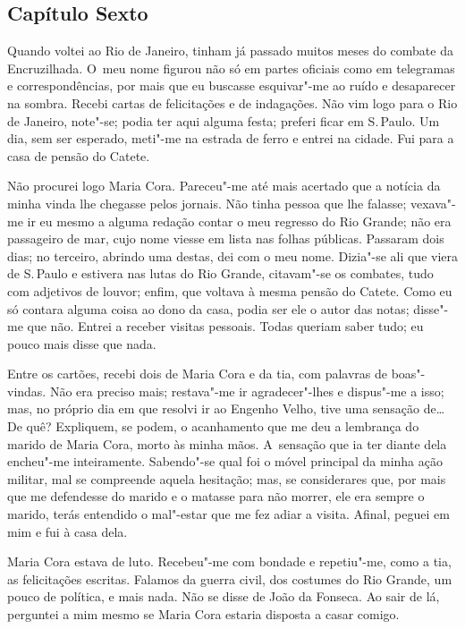 \begin{linenumbers}
\section{Capítulo Sexto}

Quando voltei ao Rio de Janeiro, tinham já passado muitos meses do
combate da Encruzilhada. O~meu nome figurou não só em partes oficiais
como em telegramas e correspondências, por mais que eu buscasse
esquivar"-me ao ruído e desaparecer na sombra. Recebi cartas de
felicitações e de indagações. Não vim logo para o Rio de Janeiro,
note"-se; podia ter aqui alguma festa; preferi ficar em S.\,Paulo. Um dia,
sem ser esperado, meti"-me na estrada de ferro e entrei na cidade. Fui
para a casa de pensão do Catete.

Não procurei logo Maria Cora. Pareceu"-me até mais acertado que a notícia
da minha vinda lhe chegasse pelos jornais. Não tinha pessoa que lhe
falasse; vexava"-me ir eu mesmo a alguma redação contar o meu regresso do
Rio Grande; não era passageiro de mar, cujo nome viesse em lista nas
folhas públicas. Passaram dois dias; no terceiro, abrindo uma destas,
dei com o meu nome. Dizia"-se ali que viera de S.\,Paulo e estivera nas
lutas do Rio Grande, citavam"-se os combates, tudo com adjetivos de
louvor; enfim, que voltava à mesma pensão do Catete. Como eu só contara
alguma coisa ao dono da casa, podia ser ele o autor das notas; disse"-me
que não. Entrei a receber visitas pessoais. Todas queriam saber tudo; eu
pouco mais disse que nada.

Entre os cartões, recebi dois de Maria Cora e da tia, com palavras de
boas"-vindas. Não era preciso mais; restava"-me ir agradecer"-lhes e
dispus"-me a isso; mas, no próprio dia em que resolvi ir ao Engenho
Velho, tive uma sensação de\ldots{} De quê? Expliquem, se podem, o
acanhamento que me deu a lembrança do marido de Maria Cora, morto às
minha mãos. A~sensação que ia ter diante dela encheu"-me inteiramente.
Sabendo"-se qual foi o móvel principal da minha ação militar, mal se
compreende aquela hesitação; mas, se considerares que, por mais que me
defendesse do marido e o matasse para não morrer, ele era sempre o
marido, terás entendido o mal"-estar que me fez adiar a visita. Afinal,
peguei em mim e fui à casa dela.

Maria Cora estava de luto. Recebeu"-me com bondade e repetiu"-me, como a
tia, as felicitações escritas. Falamos da guerra civil, dos costumes do
Rio Grande, um pouco de política, e mais nada. Não se disse de João da
Fonseca. Ao sair de lá, perguntei a mim mesmo se Maria Cora estaria
disposta a casar comigo.


\end{linenumbers}
